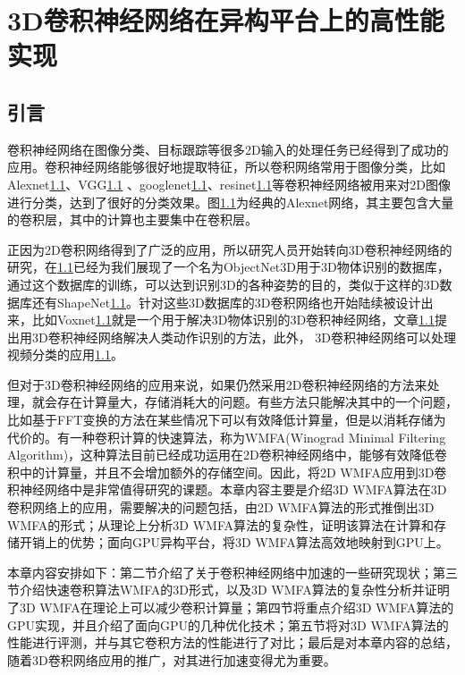 \chapter{3D卷积神经网络在异构平台上的高性能实现}
\label{3DWinograd}
\section{引言}
卷积神经网络在图像分类、目标跟踪等很多2D输入的处理任务已经得到了成功的应用。卷积神经网络能够很好地提取特征，所以卷积网络常用于图像分类，比如Alexnet\ref{}、VGG\ref{} 、googlenet\ref{}、resinet\ref{}等卷积神经网络被用来对2D图像进行分类，达到了很好的分类效果。图\ref{}为经典的Alexnet网络，其主要包含大量的卷积层，其中的计算也主要集中在卷积层。

正因为2D卷积网络得到了广泛的应用，所以研究人员开始转向3D卷积神经网络的研究，在\ref{}已经为我们展现了一个名为ObjectNet3D用于3D物体识别的数据库，通过这个数据库的训练，可以达到识别3D的各种姿势的目的，类似于这样的3D数据库还有ShapeNet\ref{}。针对这些3D数据库的3D卷积网络也开始陆续被设计出来，比如Voxnet\ref{}就是一个用于解决3D物体识别的3D卷积神经网络，文章\ref{}提出用3D卷积神经网络解决人类动作识别的方法，此外， 3D卷积神经网络可以处理视频分类的应用\ref{}。

但对于3D卷积神经网络的应用来说，如果仍然采用2D卷积神经网络的方法来处理，就会存在计算量大，存储消耗大的问题。有些方法只能解决其中的一个问题，比如基于FFT变换的方法在某些情况下可以有效降低计算量，但是以消耗存储为代价的。有一种卷积计算的快速算法，称为WMFA(Winograd Minimal Filtering Algorithm)，这种算法目前已经成功运用在2D卷积神经网络中，能够有效降低卷积中的计算量，并且不会增加额外的存储空间。因此，将2D WMFA应用到3D卷积神经网络中是非常值得研究的课题。本章内容主要是介绍3D WMFA算法在3D卷积网络上的应用，需要解决的问题包括，由2D WMFA算法的形式推倒出3D WMFA的形式；从理论上分析3D WMFA算法的复杂性，证明该算法在计算和存储开销上的优势；面向GPU异构平台，将3D WMFA算法高效地映射到GPU上。

本章内容安排如下：第二节介绍了关于卷积神经网络中加速的一些研究现状；第三节介绍快速卷积算法WMFA的3D形式，以及3D WMFA算法的复杂性分析并证明了3D WMFA在理论上可以减少卷积计算量；第四节将重点介绍3D WMFA算法的GPU实现，并且介绍了面向GPU的几种优化技术；第五节将对3D WMFA算法的性能进行评测，并与其它卷积方法的性能进行了对比；最后是对本章内容的总结，随着3D卷积网络应用的推广，对其进行加速变得尤为重要。

